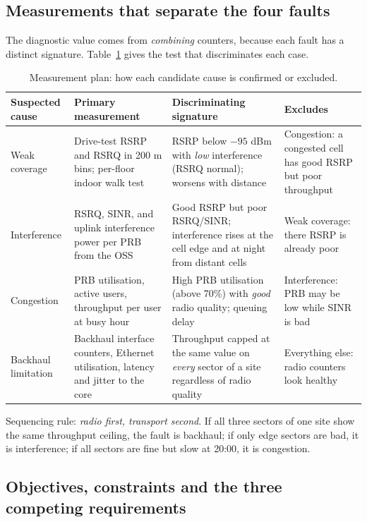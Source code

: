 \documentclass[9pt,a4paper]{article}
\begin{document}
\subsection{Measurements that separate the four faults}
The diagnostic value comes from \emph{combining} counters, because each fault has a distinct
signature. Table~\ref{tab:diag} gives the test that discriminates each case.

\begin{table}[H]\centering\small
\caption{Measurement plan: how each candidate cause is confirmed or excluded.}
\label{tab:diag}
\begin{tabularx}{\textwidth}{@{}p{2.35cm}p{3.6cm}Xp{3.35cm}@{}}
\toprule
\textbf{Suspected cause} & \textbf{Primary measurement} & \textbf{Discriminating signature} & \textbf{Excludes} \\
\midrule
Weak coverage & Drive-test RSRP and RSRQ in 200 m bins; per-floor indoor walk test & RSRP below $-95$ dBm with \emph{low} interference (RSRQ normal); worsens with distance & Congestion: a congested cell has good RSRP but poor throughput \\
Interference & RSRQ, SINR, and uplink interference power per PRB from the OSS & Good RSRP but poor RSRQ/SINR; interference rises at the cell edge and at night from distant cells & Weak coverage: there RSRP is already poor \\
Congestion & PRB utilisation, active users, throughput per user at busy hour & High PRB utilisation (above 70\%) with \emph{good} radio quality; queuing delay & Interference: PRB may be low while SINR is bad \\
Backhaul limitation & Backhaul interface counters, Ethernet utilisation, latency and jitter to the core & Throughput capped at the same value on \emph{every} sector of a site regardless of radio quality & Everything else: radio counters look healthy \\
\bottomrule
\end{tabularx}
\end{table}

Sequencing rule: \emph{radio first, transport second}. If all three sectors of one site show
the same throughput ceiling, the fault is backhaul; if only edge sectors are bad, it is
interference; if all sectors are fine but slow at 20:00, it is congestion.

\subsection{Objectives, constraints and the three competing requirements}
\end{document}
